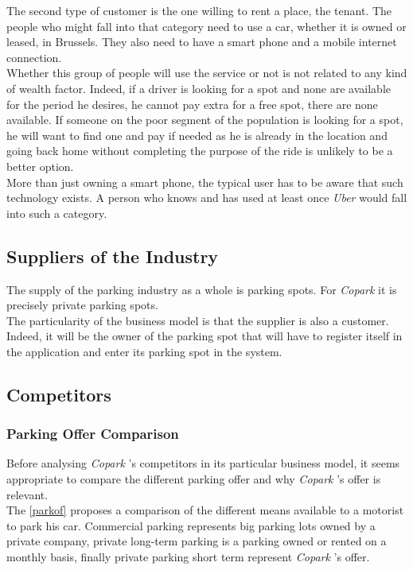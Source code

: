 \documentclass[12pt,a4paper,oneside]{book}
\newcommand{\bp}{\textit{Copark }}
\begin{document}
The second type of customer is the one willing to rent a place, the tenant. The people who might fall into that category need to use a car, whether it is owned or leased, in Brussels. They also need to have a smart phone and a mobile internet connection.\\
Whether this group of people will use the service or not is not related to any kind of wealth factor. Indeed, if a driver is looking for a spot and none are available for the period he desires, he cannot pay extra for a free spot, there are none available. If someone on the poor segment of the population is looking for a spot, he will want to find one and pay if needed as he is already in the location and going back home without completing the purpose of the ride is unlikely to be a better option.\\
More than just owning a smart phone, the typical user has to be aware that such technology exists. A person who knows and has used at least once \textit{Uber} would fall into such a category.

\subsection{Suppliers of the Industry}
The supply of the parking industry as a whole is parking spots. For \bp it is precisely private parking spots.\\
The particularity of the business model is that the supplier is also a customer. Indeed, it will be the owner of the parking spot that will have to register itself in the application and enter its parking spot in the system.

\subsection{Competitors}
\subsubsection{Parking Offer Comparison}
\label{poc}
Before analysing \bp 's competitors in its particular business model, it seems appropriate to compare the different parking offer and why \bp 's offer is relevant.\\

The \autoref{parkof} proposes a comparison of the different means available to a motorist to park his car. Commercial parking represents big parking lots owned by a private company, private long-term parking is a parking owned or rented on a monthly basis, finally private parking short term represent \bp 's offer.
\end{document}
